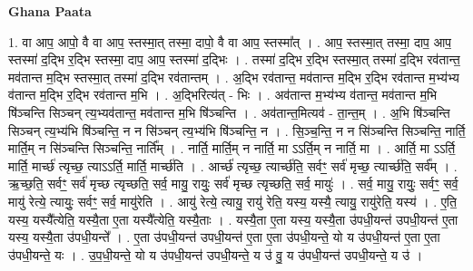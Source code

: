 \documentclass[17pt]{extarticle}
\begin{document}
\textbf{Ghana Paata } \newline

1. वा आप॒ आपो॒ वै वा आप॒ स्तस्मा॒त् तस्मा॒ दापो॒ वै वा आप॒ स्तस्मा᳚त् । . आप॒ स्तस्मा॒त् तस्मा॒ दाप॒ आप॒ स्तस्मा॑ द॒द्भि र॒द्भि स्तस्मा॒ दाप॒ आप॒ स्तस्मा॑ द॒द्भिः । . तस्मा॑ द॒द्भि र॒द्भि स्तस्मा॒त् तस्मा॑ द॒द्भि रव॑तान्त॒ मव॑तान्त म॒द्भि स्तस्मा॒त् तस्मा॑ द॒द्भि रव॑तान्तम् । . अ॒द्भि रव॑तान्त॒ मव॑तान्त म॒द्भि र॒द्भि रव॑तान्त म॒भ्य॑भ्य व॑तान्त म॒द्भि र॒द्भि रव॑तान्त म॒भि । . अ॒द्भिरित्य॑त् - भिः । . अव॑तान्त म॒भ्य॑भ्य व॑तान्त॒ मव॑तान्त म॒भि षि॑ञ्चन्ति सिञ्चन् त्य॒भ्यव॑तान्त॒ मव॑तान्त म॒भि षि॑ञ्चन्ति । . अव॑तान्त॒मित्यव॑ - ता॒न्त॒म् । . अ॒भि षि॑ञ्चन्ति सिञ्चन् त्य॒भ्य॑भि षि॑ञ्चन्ति॒ न न सि॑ञ्चन् त्य॒भ्य॑भि षि॑ञ्चन्ति॒ न । . सि॒ञ्च॒न्ति॒ न न सि॑ञ्चन्ति सिञ्चन्ति॒ नार्ति॒ मार्ति॒म् न सि॑ञ्चन्ति सिञ्चन्ति॒ नार्ति᳚म् । . नार्ति॒ मार्ति॒म् न नार्ति॒ मा ऽऽर्ति॒म् न नार्ति॒ मा । . आर्ति॒ मा ऽऽर्ति॒ मार्ति॒ मार्च्छ॑ त्यृच्छ॒ त्याऽऽर्ति॒ मार्ति॒ मार्च्छ॑ति । . आर्च्छ॑ त्यृच्छ॒ त्यार्च्छ॑ति॒ सर्वꣳ॒॒ सर्व॑ मृच्छ॒ त्यार्च्छ॑ति॒ सर्व᳚म् । . ऋ॒च्छ॒ति॒ सर्वꣳ॒॒ सर्व॑ मृच्छ त्यृच्छति॒ सर्व॒ मायु॒ रायुः॒ सर्व॑ मृच्छ त्यृच्छति॒ सर्व॒ मायुः॑ । . सर्व॒ मायु॒ रायुः॒ सर्वꣳ॒॒ सर्व॒ मायु॑ रेत्ये॒ त्यायुः॒ सर्वꣳ॒॒ सर्व॒ मायु॑रेति । . आयु॑ रेत्ये॒ त्यायु॒ रायु॑ रेति॒ यस्य॒ यस्यै॒ त्यायु॒ रायु॑रेति॒ यस्य॑ । . ए॒ति॒ यस्य॒ यस्यै᳚त्येति॒ यस्यै॒ता ए॒ता यस्यै᳚त्येति॒ यस्यै॒ताः । . यस्यै॒ता ए॒ता यस्य॒ यस्यै॒ता उ॑पधी॒यन्त॑ उपधी॒यन्त॑ ए॒ता यस्य॒ यस्यै॒ता उ॑पधी॒यन्ते᳚ । . ए॒ता उ॑पधी॒यन्त॑ उपधी॒यन्त॑ ए॒ता ए॒ता उ॑पधी॒यन्ते॒ यो य उ॑पधी॒यन्त॑ ए॒ता ए॒ता उ॑पधी॒यन्ते॒ यः । . उ॒प॒धी॒यन्ते॒ यो य उ॑पधी॒यन्त॑ उपधी॒यन्ते॒ य उ॑ वु॒ य उ॑पधी॒यन्त॑ उपधी॒यन्ते॒ य उ॑ । \newline
\end{document}
